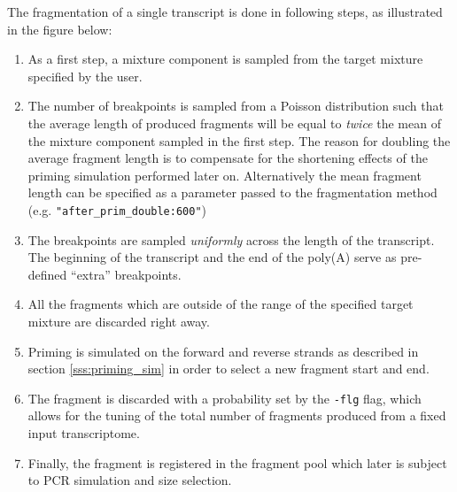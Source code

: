 The fragmentation of a single transcript is done in following steps, as illustrated in the figure below:
\begin{enumerate}
    \item{As a first step, a mixture component is sampled from the target mixture specified by the user.}
    \item{The number of breakpoints is sampled from a Poisson distribution such that the average length of produced fragments will be equal to \emph{twice} the mean of the mixture component sampled in the first step. The reason for doubling the average fragment length is to compensate for the shortening effects of the priming simulation performed later on. Alternatively the mean fragment length can be specified as a parameter passed to the fragmentation method (e.g. \texttt{"after\_prim\_double:600"})}
    \item{The breakpoints are sampled \emph{uniformly} across the length of the transcript. The beginning of the transcript and the end of the poly(A) serve as pre-defined ``extra'' breakpoints.}
    \item{All the fragments which are outside of the range of the specified target mixture are discarded right away.}
    \item{Priming is simulated on the forward and reverse strands as described in section \ref{sss:priming_sim} in order to select a new fragment start and end.}
    \item{The fragment is discarded with a probability set by the \texttt{-flg} flag, which allows for the tuning of the total number of fragments produced from a fixed input transcriptome.}
    \item{Finally, the fragment is registered in the fragment pool which later is subject to PCR simulation and size selection.}
\end{enumerate}

